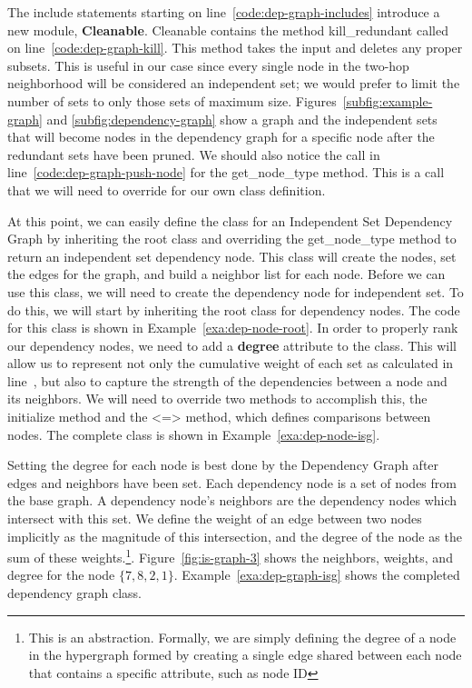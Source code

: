 

The {\ttfamily include} statements starting on line~\ref{code:dep-graph-includes} introduce a new module, {\bfseries Cleanable}. Cleanable contains the method {\ttfamily kill\_redundant} called on line~\ref{code:dep-graph-kill}. This method takes the input and deletes any proper subsets. This is useful in our case since every single node in the two-hop neighborhood will be considered an independent set; we would prefer to limit the number of sets to only those sets of maximum size. Figures~\ref{subfig:example-graph} and \ref{subfig:dependency-graph} show a graph and the independent sets that will become nodes in the dependency graph for a specific node after the redundant sets have been pruned. We should also notice the call in line~\ref{code:dep-graph-push-node} for the {\ttfamily get\_node\_type} method. This is a call that we will need to override for our own class definition. 



At this point, we can easily define the class for an Independent Set Dependency Graph by inheriting the root class and overriding the {\ttfamily get\_node\_type} method to return an independent set dependency node. This class will create the nodes, set the edges for the graph, and build a neighbor list for each node. Before we can use this class, we will need to create the dependency node for independent set. To do this, we will start by inheriting the root class for dependency nodes. The code for this class is shown in Example~\ref{exa:dep-node-root}. In order to properly rank our dependency nodes, we need to add a {\bfseries degree} attribute to the class. This will allow us to represent not only the cumulative weight of each set as calculated in line~, but also to capture the strength of the dependencies between a node and its neighbors. We will need to override two methods to accomplish this, the {\ttfamily initialize} method and the {\ttfamily <=>} method, which defines comparisons between nodes. The complete class is shown in Example~\ref{exa:dep-node-isg}.




Setting the degree for each node is best done by the Dependency Graph after edges and neighbors have been set. Each dependency node is a set of nodes from the base graph. A dependency node's neighbors are the dependency nodes which intersect with this set. We define the weight of an edge between two nodes implicitly as the magnitude of this intersection, and the degree of the node as the sum of these weights.\footnote{This is an abstraction. Formally, we are simply defining the degree of a node in the hypergraph formed by creating a single edge shared between each node that contains a specific attribute, such as node ID}.  Figure~\ref{fig:is-graph-3} shows the neighbors, weights, and degree for the node $\{7,8,2,1\}$. Example~\ref{exa:dep-graph-isg} shows the completed dependency graph class.
 

